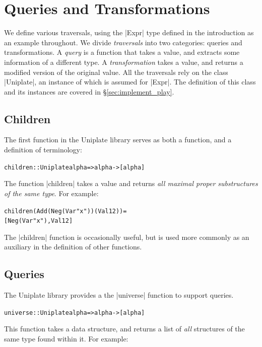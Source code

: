 \documentclass[preprint]{sigplanconf}
\newenvironment{code}{\begin{alltt}\small}{\end{alltt}}
\begin{document}
\section{Queries and Transformations}
\label{sec:use_play}

We define various traversals, using the |Expr| type defined in the introduction as an example throughout. We divide \textit{traversals} into two categories: queries and transformations. A \textit{query} is a function that takes a value, and extracts some information of a different type. A \textit{transformation} takes a value, and returns a modified version of the original value. All the traversals rely on the class |Uniplate|, an instance of which is assumed for |Expr|. The definition of this class and its instances are covered in \S\ref{sec:implement_play}.

\subsection{Children}

The first function in the Uniplate library serves as both a function, and a definition of terminology:

\begin{code}
children :: Uniplate alpha => alpha -> [alpha]
\end{code}

The function |children| takes a value and returns \textit{all maximal proper substructures of the same type}. For example:

\begin{code}
children (Add (Neg (Var "x")) (Val 12)) =
    [Neg (Var "x"), Val 12]
\end{code}

The |children| function is occasionally useful, but is used more commonly as an auxiliary in the definition of other functions.


\subsection{Queries}

The Uniplate library provides a the |universe| function to support queries.

\begin{code}
universe :: Uniplate alpha => alpha -> [alpha]
\end{code}

This function takes a data structure, and returns a list of \textit{all} structures of the same type found within it. For example:
\end{document}
